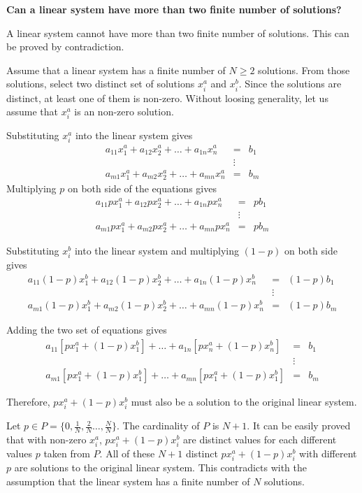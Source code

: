 \begin{mdframed}

\noindent \textbf{Can a linear system have more than two finite number of solutions?}

A linear system cannot have more than two finite number of solutions. This can be proved by contradiction.

Assume that a linear system has a finite number of $N\geq 2$ solutions. From those solutions, select two distinct set of solutions $x_i^a$ and $x_i^b$. Since the solutions are distinct, at least one of them is non-zero. Without loosing generality, let us assume that $x_i^a$ is an non-zero solution.

Substituting $x_i^a$ into the linear system gives
\begin{eqnarray}
a_{11} x_1^a + a_{12} x_2^a + \ldots + a_{1n} x_n^a &=& b_1 \nonumber \\
& \vdots & \nonumber \\
a_{m1} x_1^a + a_{m2} x_2^a + \ldots + a_{mn} x_n^a &=& b_m \nonumber
\end{eqnarray}
Multiplying $p$ on both side of the equations gives
\begin{eqnarray}
a_{11} px_1^a + a_{12} px_2^a + \ldots + a_{1n} px_n^a &=& pb_1 \nonumber \\
& \vdots & \nonumber \\
a_{m1} px_1^a + a_{m2} px_2^a + \ldots + a_{mn} px_n^a &=& pb_m \nonumber
\end{eqnarray}

Substituting $x_i^b$ into the linear system and multiplying $(1-p)$ on both side gives
\begin{eqnarray}
a_{11} (1-p)x_1^b + a_{12} (1-p)x_2^b + \ldots + a_{1n} (1-p)x_n^b &=& (1-p)b_1 \nonumber \\
& \vdots & \nonumber \\
a_{m1} (1-p)x_1^b + a_{m2} (1-p)x_2^b + \ldots + a_{mn} (1-p)x_n^b &=& (1-p)b_m \nonumber
\end{eqnarray}

Adding the two set of equations gives
\begin{eqnarray}
a_{11} \left[px_1^a + (1-p)x_1^b\right]  + \ldots + a_{1n} \left[px_n^a + (1-p)x_n^b\right] &=& b_1 \nonumber \\
& \vdots & \nonumber \\
a_{m1} \left[px_1^a + (1-p)x_1^b\right] + \ldots + a_{mn} \left[px_1^a + (1-p)x_1^b\right] &=& b_m \nonumber
\end{eqnarray}

Therefore, $px_i^a + (1-p)x_i^b$ must also be a solution to the original linear system. 

Let $p \in P = \{0, \frac{1}{N}, \frac{2}{N} \ldots, \frac{N}{N}\}$. The cardinality of $P$ is $N+1$. It can be easily proved that with non-zero $x_i^a$, $px_i^a + (1-p)x_i^b$ are distinct values for each different values $p$ taken from $P$. All of these $N+1$ distinct $px_i^a + (1-p)x_i^b$ with different $p$ are solutions to the original linear system. This contradicts with the assumption that the linear system has a finite number of $N$ solutions.

\end{mdframed}

